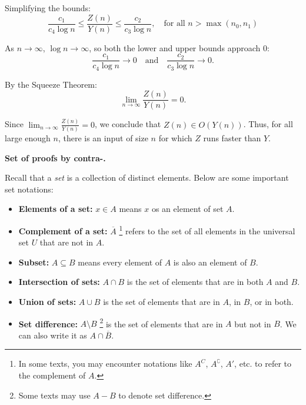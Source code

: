 \documentclass[11pt,addpoints]{exam}
\begin{document}
\begin{questions}
\begin{parts}
\begin{solution}
      Simplifying the bounds:
      \[
      \frac{c_1}{c_4 \log n} \leq \frac{Z(n)}{Y(n)} \leq \frac{c_2}{c_3 \log n}, \quad \text{for all } n > \max(n_0,n_1)
      \]

      As $n \to \infty$, $\log n \to \infty$, so both the lower and upper bounds approach 0:
      \[
      \frac{c_1}{c_4 \log n} \to 0 \quad \text{and} \quad \frac{c_2}{c_3 \log n} \to 0.
      \]

      By the Squeeze Theorem:
      \[
      \lim_{n \to \infty} \frac{Z(n)}{Y(n)} = 0.
      \]

      Since $\lim_{n \to \infty} \frac{Z(n)}{Y(n)} = 0$, we conclude that $Z(n) \in O(Y(n))$. Thus, for all large enough $n$, there is an input of size $n$ for which $Z$ runs faster than $Y$.
    \end{solution}

\end{parts}
    \newpage
    \question \textbf{Set of proofs by contra-.}
    
    Recall that a \emph{set} is a collection of distinct elements. Below are some important set notations:
    \begin{itemize}
        \item \textbf{Elements of a set:} $x \in A$ means $x$ os an element of set $A$. 
        \item \textbf{Complement of a set:} $\overline{A}$ \footnote{In some texts, you may encounter notations like $A^C$, $A^\complement$, $A'$, etc. to refer to the complement of $A$.} refers to the set of all elements in the universal set $U$ that are not in $A$.
        \item \textbf{Subset:} $A \subseteq B$ means every element of $A$ is also an element of $B$. 
        \item \textbf{Intersection of sets:} $A \cap B$ is the set of elements that are in both $A$ and $B$. 
        \item \textbf{Union of sets:} $A \cup B$ is the set of elements that are in $A$, in $B$, or in both.
        \item \textbf{Set difference:} $A \setminus B$ \footnote{Some texts may use $A - B$ to denote set difference.} is the set of elements that are in $A$ but not in $B$. We can also write it as $A \cap \overline{B}$.
    \end{itemize}

\end{questions}
\end{document}
